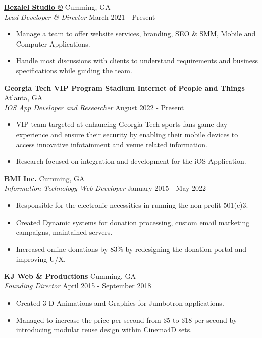 \documentclass[a4paper]{article}
\begin{document}
\textbf {\href{https://bezalelstudio.co}{Bezalel Studio ®}} \hfill Cumming, GA\\
\textit{Lead Developer \& Director} \hfill March 2021 - Present\\
\vspace{-1mm}
\begin{itemize} \itemsep 1pt
	\item Manage a team to offer website services, branding, SEO \& SMM, Mobile and Computer Applications.
	\item Handle most discussions with clients to understand requirements and business specifications while guiding the team.
\end{itemize}
\textbf{Georgia Tech VIP Program \textbar{} Stadium Internet of People and Things} \hfill Atlanta, GA\\
\textit{IOS App Developer and Researcher} \hfill August 2022 - Present\\
\vspace{-1mm}
\begin{itemize} \itemsep 1pt
	\item VIP team targeted at enhancing Georgia Tech sports fans\textquotesingle{} game-day experience and ensure their security by enabling their mobile devices to access innovative infotainment and venue related information.
	\item Research focused on integration and development for the iOS Application.
\end{itemize}
\textbf{BMI Inc.} \hfill Cumming, GA\\
\textit{Information Technology Web Developer} \hfill January 2015 - May 2022\\
\vspace{-1mm}
\begin{itemize} \itemsep 1pt
	\item Responsible for the electronic necessities in running the non-profit 501(c)3.
	\item Created Dynamic systems for donation processing, custom email marketing campaigns, maintained servers.
	\item Increased online donations by 83\% by redesigning the donation portal and improving U/X.
\end{itemize}
\textbf{KJ Web \& Productions} \hfill Cumming, GA\\
\textit{Founding Director} \hfill April 2015 - September 2018\\
\vspace{-1mm}
\begin{itemize} \itemsep 1pt
	\item Created 3-D Animations and Graphics for Jumbotron applications.
	\item Managed to increase the price per second from \$5 to \$18 per second by introducing modular reuse design within Cinema4D sets.
\end{itemize}
\end{document}
